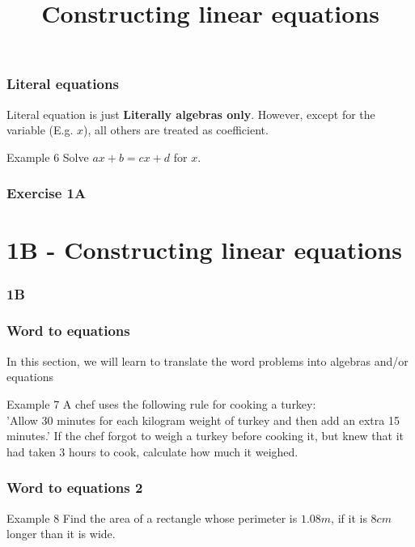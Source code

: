 \documentclass{beamer}
\begin{document}
\begin{frame}[t]
    \frametitle{Literal equations}
    Literal equation is just \textbf{Literally algebras only}. However, except for the variable (E.g. $x$), all others are treated as coefficient.\\
    \begin{block}{Example 6}
        Solve $ax + b = cx + d$ for $x$.
    \end{block}
\end{frame}

\begin{frame}
    \frametitle{Exercise 1A}
\end{frame}


\section{1B - Constructing linear equations}
\begin{frame}
    \frametitle{1B}
    \begin{center}
        \title{Constructing linear equations}
        \maketitle
    \end{center}
\end{frame}

\begin{frame}[t]
    \frametitle{Word to equations}
    In this section, we will learn to translate the word problems into algebras and/or equations\\
    \begin{block}{Example 7}
    A chef uses the following rule for cooking a turkey:\\
    'Allow 30 minutes for each kilogram weight of turkey and then add an extra 15 minutes.'
    If the chef forgot to weigh a turkey before cooking it, but knew that it had taken 3 hours to
    cook, calculate how much it weighed.
    \end{block}
\end{frame}

\begin{frame}[t]
    \frametitle{Word to equations 2}
    \begin{block}{Example 8}
        Find the area of a rectangle whose perimeter is $1.08 m$, if it is $8 cm$ longer than it is wide.
    \end{block}
\end{frame}
\end{document}
